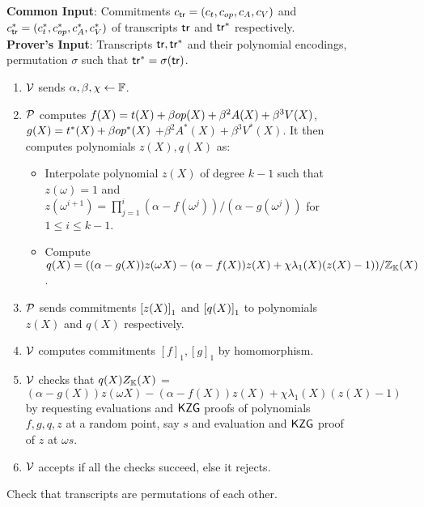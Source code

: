\begin{figure}[htbp]

    \begin{mdframed}
    {
            {\bf Common Input}: Commitments $c_{\mathsf{tr}}=(c_t,c_{op},c_A, c_V)$ and $c_{\mathsf{tr}}^\ast=(c_t^\ast,c_{op}^\ast, c_A^\ast, c_V^\ast)$
        of transcripts $\mathsf{tr}$ and $\mathsf{tr}^\ast$ respectively.\\
    {\bf Prover's Input}: Transcripts $\mathsf{tr}, \mathsf{tr}^{*}$ and their polynomial encodings, permutation $\sigma$ such that $\mathsf{tr}^{*}=\sigma(\mathsf{tr})$.
        \begin{enumerate}[leftmargin=1em, label=\arabic*]
            \item $\mathcal{V}$ sends $\alpha,\beta, \chi\gets \mathbb{F}$.
            \item $\mathcal{P}$ computes $f(X)=t(X) + \beta {op}(X) + \beta^2 A(X) + \beta^3 V(X)$, $g(X) = t^\ast(X) + \beta {op}^\ast(X)$
            $+ \beta^2 A^\ast(X) + \beta^3 V^\ast(X)$. It then computes polynomials $z(X),q(X)$ as:
            \begin{itemize}[leftmargin=1em]
                \item Interpolate polynomial $z(X)$ of degree $k-1$ such that $z(\omega)=1$ and
                $z(\omega^{i+1})=\prod_{j=1}^i (\alpha - f(\omega^j))/(\alpha - g(\omega^j))$ for $1\leq i\leq k-1$.
                \item Compute $q(X) = ((\alpha - g(X))z(\omega X) - (\alpha - f(X))z(X) + \chi\lambda_1(X)(z(X) - 1))/\mathbb{Z}_{\mathbb{K}}(X)$.
            \end{itemize}
            \item $\mathcal{P}$ sends commitments $\left[{z(X)}\right]_1$ and $\left[{q(X)}\right]_1$ to polynomials $z(X)$ and $q(X)$ respectively.
            \item $\mathcal{V}$ computes commitments $[f]_1, [g]_1$ by homomorphism.
            \item $\mathcal{V}$ checks that $q(X)Z_{\mathbb{K}}(X)$ = $(\alpha - g(X))z(\omega X)-(\alpha - f(X))z(X) + \chi\lambda_1(X)(z(X) - 1)$
            by requesting evaluations and $\mathsf{KZG}$ proofs of polynomials $f,g, q, z$ at a random point, say $s$ and evaluation and $\mathsf{KZG}$ proof of $z$ at $\omega s$.
            \item $\mathcal{V}$ accepts if all the checks succeed, else it rejects.
        \end{enumerate}
    }
    \end{mdframed}
    \caption{Check that transcripts are permutations of each other.}
    \label{fig:permutated-transcripts}
\end{figure}

